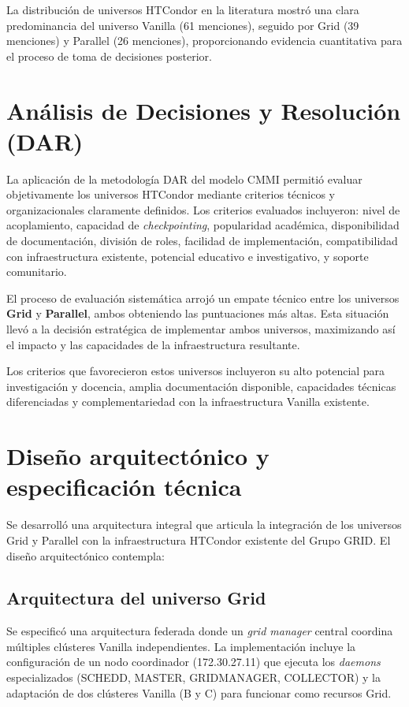 La distribución de universos HTCondor en la literatura mostró una clara predominancia del universo Vanilla (61 menciones), seguido por Grid (39 menciones) y Parallel (26 menciones), proporcionando evidencia cuantitativa para el proceso de toma de decisiones posterior.

\section{Análisis de Decisiones y Resolución (DAR)}
\noindent

La aplicación de la metodología DAR del modelo CMMI permitió evaluar objetivamente los universos HTCondor mediante criterios técnicos y organizacionales claramente definidos. Los criterios evaluados incluyeron: nivel de acoplamiento, capacidad de \textit{checkpointing}, popularidad académica, disponibilidad de documentación, división de roles, facilidad de implementación, compatibilidad con infraestructura existente, potencial educativo e investigativo, y soporte comunitario.

El proceso de evaluación sistemática arrojó un empate técnico entre los universos \textbf{Grid} y \textbf{Parallel}, ambos obteniendo las puntuaciones más altas. Esta situación llevó a la decisión estratégica de implementar ambos universos, maximizando así el impacto y las capacidades de la infraestructura resultante.

Los criterios que favorecieron estos universos incluyeron su alto potencial para investigación y docencia, amplia documentación disponible, capacidades técnicas diferenciadas y complementariedad con la infraestructura Vanilla existente.

\section{Diseño arquitectónico y especificación técnica}
\noindent

Se desarrolló una arquitectura integral que articula la integración de los universos Grid y Parallel con la infraestructura HTCondor existente del Grupo GRID. El diseño arquitectónico contempla:

\subsection{Arquitectura del universo Grid}
\noindent

Se especificó una arquitectura federada donde un \textit{grid manager} central coordina múltiples clústeres Vanilla independientes. La implementación incluye la configuración de un nodo coordinador (172.30.27.11) que ejecuta los \textit{daemons} especializados (SCHEDD, MASTER, GRIDMANAGER, COLLECTOR) y la adaptación de dos clústeres Vanilla (B y C) para funcionar como recursos Grid.

